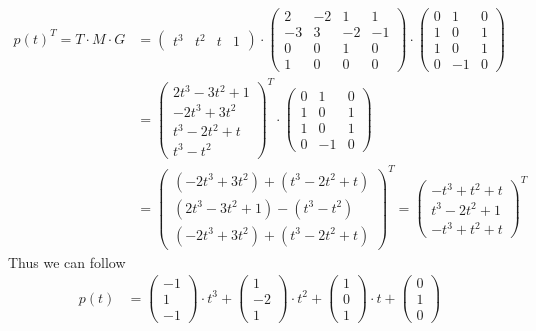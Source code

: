 \documentclass{article}
\begin{document}
        \begin{align}
            p(t)^T = T \cdot M \cdot G
            &= \left(\begin{matrix} t^3 & t^2 & t & 1 \end{matrix}\right)
                \cdot \left(\begin{matrix} 2&-2&1&1 \\ -3&3&-2&-1 \\ 0&0&1&0 \\ 1&0&0&0 \end{matrix}\right)
                \cdot \left(\begin{matrix} 0&1&0 \\ 1&0&1 \\ 1&0&1 \\ 0&-1&0 \end{matrix}\right)\\
            &= \left(\begin{matrix} 2t^3-3t^2+1 \\ -2t^3+3t^2 \\ t^3-2t^2+t \\ t^3-t^2 \end{matrix}\right)^T
                \cdot \left(\begin{matrix} 0&1&0 \\ 1&0&1 \\ 1&0&1 \\ 0&-1&0 \end{matrix}\right)\\
            &= \left(\begin{matrix} (-2t^3+3t^2) + (t^3-2t^2+t) \\ (2t^3-3t^2+1) - (t^3-t^2) \\ (-2t^3+3t^2) + (t^3-2t^2+t) \end{matrix}\right)^T
            = \left(\begin{matrix} -t^3+t^2+t \\ t^3-2t^2+1 \\ -t^3+t^2+t \end{matrix}\right)^T
        \end{align}
        Thus we can follow
        \begin{align}
            p(t) &= \left(\begin{matrix} -1\\1\\-1 \end{matrix}\right) \cdot t^3 + \left(\begin{matrix} 1\\-2\\1 \end{matrix}\right) \cdot t^2
                + \left(\begin{matrix} 1\\0\\1 \end{matrix}\right) \cdot t + \left(\begin{matrix} 0\\1\\0 \end{matrix}\right)
        \end{align}
\end{document}
